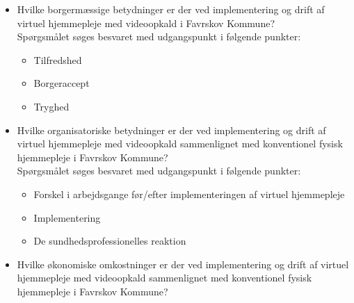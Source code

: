 \begin{itemize}
	\item Hvilke borgermæssige betydninger er der ved implementering og drift af virtuel hjemmepleje med videoopkald i Favrskov Kommune? \\Spørgsmålet søges besvaret med udgangspunkt i følgende punkter:
	\begin{itemize}
	\item Tilfredshed
	\item Borgeraccept
	\item Tryghed
\end{itemize}
\end{itemize}

\begin{itemize}
	\item Hvilke organisatoriske betydninger er der ved implementering og drift af virtuel hjemmepleje med videoopkald sammenlignet med konventionel fysisk hjemmepleje i Favrskov Kommune? \\Spørgsmålet søges besvaret med udgangspunkt i følgende punkter:
	\begin{itemize}
	\item Forskel i arbejdsgange før/efter implementeringen af virtuel hjemmepleje
	\item Implementering
	\item De sundhedsprofessionelles reaktion

\end{itemize}
\end{itemize}


\begin{itemize}
	\item Hvilke økonomiske omkostninger er der ved implementering og drift af virtuel hjemmepleje med videoopkald sammenlignet med konventionel fysisk hjemmepleje i Favrskov Kommune?
\end{itemize}

